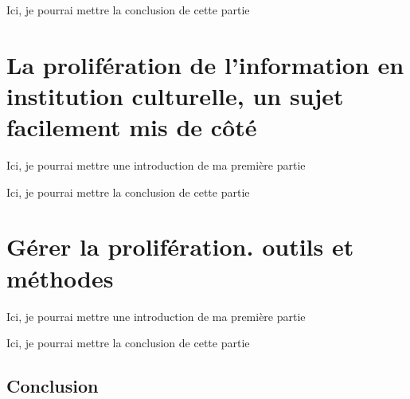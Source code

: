 \documentclass[12pt,twoside]{book}
\begin{document}


Ici, je pourrai mettre la conclusion de cette partie

%
%	
	
	\part{La prolifération de l’information en institution culturelle, un sujet facilement mis de côté}
	
	
	
	Ici, je pourrai mettre une introduction de ma première partie
	
	
	
	
	
	Ici, je pourrai mettre la conclusion de cette partie
	
		\part{Gérer la prolifération. outils et méthodes}
	
	
	
	Ici, je pourrai mettre une introduction de ma première partie
	
	
	
	
	
	Ici, je pourrai mettre la conclusion de cette partie
	
	
	\chapter*{Conclusion}
\newpage{\pagestyle{empty}\cleardoublepage}
	






\end{document}
